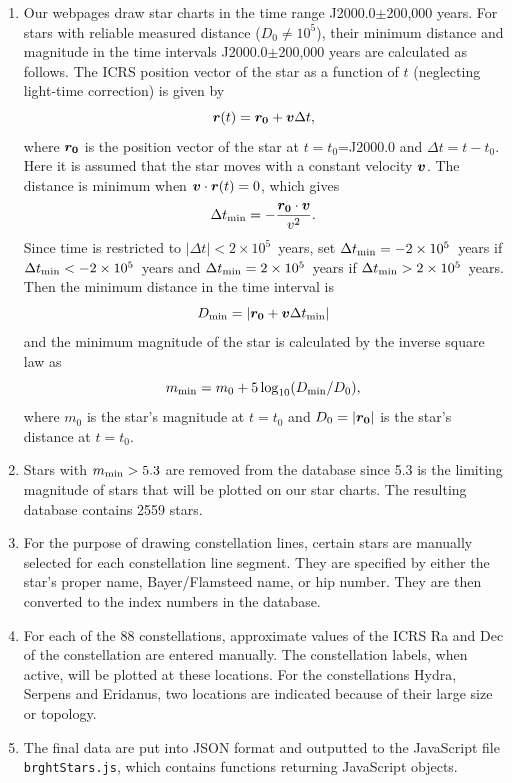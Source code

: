 \documentclass[12pt]{article}
\newcommand \beq {\begin{equation}}
\newcommand \eeq {\end{equation}}
\newcommand{\ve}[1]{\mbox{\boldmath $#1$}}
\begin{document}
\begin{enumerate}
\item Our webpages draw star charts in the time range J2000.0$\pm$200,000 years. 
For stars with reliable measured distance ($D_0 \neq 10^5$), their minimum 
distance and magnitude in the time intervals J2000.0$\pm$200,000 years are 
calculated as follows. The ICRS position vector of the star as a function of $t$ 
(neglecting light-time correction) is given by 
\beq
  \ve{r}(t) = \ve{r_0} + \ve{v} \Delta t ,
\eeq
where $\ve{r_0}$ is the position vector of the star at $t=t_0$=J2000.0 and 
$\Delta t = t-t_0$. Here it is assumed that the star moves with a constant 
velocity $\ve{v}$. The distance is minimum when $\ve{v}\cdot \ve{r}(t)=0$, 
which gives 
\beq
  \Delta t_{\rm min} = -\frac{\ve{r_0}\cdot \ve{v}}{v^2} .
\eeq
Since time is restricted to $|\Delta t|<2\times 10^5$~years, set 
$\Delta t_{\rm min} =-2\times 10^5$~years if $\Delta t_{\rm min}< -2\times 10^5$~years  
and $\Delta t_{\rm min} =2\times 10^5$~years if $\Delta t_{\rm min}> 2\times 10^5$~years. 
Then the minimum distance in the time interval is 
\beq
  D_{\rm min} = |\ve{r_0} + \ve{v} \Delta t_{\rm min}| 
\eeq
and the minimum magnitude of the star is calculated by the inverse square law as 
\beq
  m_{\rm min} = m_0 + 5 \log_{10} (D_{\rm min}/D_0) , 
\eeq
where $m_0$ is the star's magnitude at $t=t_0$ and $D_0=|\ve{r_0}|$ is 
the star's distance at $t=t_0$.

\item Stars with $m_{\rm min} > 5.3$ are removed from the database 
since 5.3 is the limiting magnitude of stars that will be plotted on 
our star charts. The resulting database contains 2559 stars.

\item For the purpose of drawing constellation lines, certain stars 
are manually selected for each constellation line segment. They 
are specified by either the star's proper name, Bayer/Flamsteed name, 
or hip number. They are then converted to the index numbers in the database. 

\item For each of the 88 constellations, approximate values of the ICRS 
Ra and Dec of the constellation are entered manually. The constellation labels, 
when active, will be plotted at these locations. For the constellations Hydra, 
Serpens and Eridanus, two locations are indicated because of their large size 
or topology.

\item The final data are put into JSON format and outputted 
to the JavaScript file {\tt brghtStars.js}, which contains functions returning 
JavaScript objects.
\end{enumerate}
\end{document}
